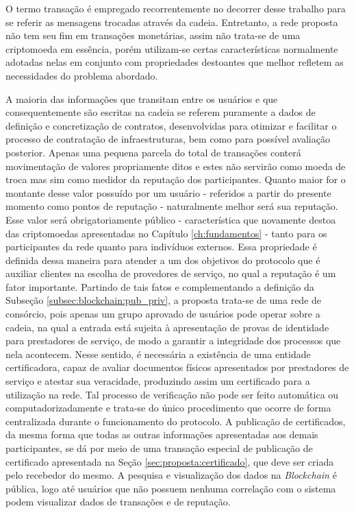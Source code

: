 %
O termo transação é empregado recorrentemente no decorrer desse trabalho para se referir as mensagens trocadas através da cadeia. Entretanto, a rede proposta não tem seu fim em transações monetárias, assim não trata-se de uma criptomoeda em essência, porém utilizam-se certas características normalmente adotadas nelas em conjunto com propriedades destoantes que melhor refletem as necessidades do problema abordado.

%
A maioria das informações que transitam entre os usuários e que consequentemente são escritas na cadeia se referem puramente a dados de definição e concretização de contratos, desenvolvidas para otimizar e facilitar o processo de contratação de infraestruturas, bem como para possível avaliação posterior.
%
Apenas uma pequena parcela do total de transações conterá movimentação de valores propriamente ditos e estes não servirão como moeda de troca mas sim como medidor da reputação dos participantes. Quanto maior for o montante desse valor possuído por um usuário - referidos a partir do presente momento como pontos de reputação - naturalmente melhor será sua reputação. Esse valor será obrigatoriamente público - característica que novamente destoa das criptomoedas apresentadas no Capítulo \ref{ch:fundamentos} - tanto para os participantes da rede quanto para indivíduos externos. Essa propriedade é definida dessa maneira para atender a um dos objetivos do protocolo que é auxiliar clientes na escolha de provedores de serviço, no qual a reputação é um fator importante. Partindo de tais fatos e complementando a definição da Subseção \ref{subsec:blockchain:pub_priv}, a proposta trata-se de uma rede de consórcio, pois apenas um grupo aprovado de usuários pode operar sobre a cadeia, na qual a entrada está sujeita à apresentação de provas de identidade para prestadores de serviço, de modo a garantir a integridade dos processos que nela acontecem. Nesse sentido, é necessária a existência de uma entidade certificadora, capaz de avaliar documentos físicos apresentados por prestadores de serviço e atestar sua veracidade, produzindo assim um certificado para a utilização na rede. Tal processo de verificação não pode ser feito automática ou computadorizadamente e trata-se do único procedimento que ocorre de forma centralizada durante o funcionamento do protocolo. A publicação de certificados, da mesma forma que todas as outras informações apresentadas aos demais participantes, se dá por meio de uma transação especial de publicação de certificado apresentada na Seção \ref{sec:proposta:certificado}, que deve ser criada pelo recebedor do mesmo. A pesquisa e visualização dos dados na \textit{Blockchain} é pública, logo até usuários que não possuem nenhuma correlação com o sistema podem visualizar dados de transações e de reputação.

